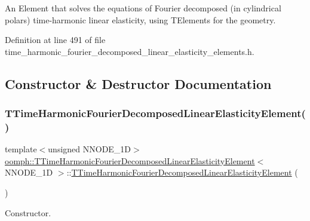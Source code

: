 An Element that solves the equations of Fourier decomposed (in cylindrical polars) time-\/harmonic linear elasticity, using T\+Elements for the geometry. 

Definition at line 491 of file time\+\_\+harmonic\+\_\+fourier\+\_\+decomposed\+\_\+linear\+\_\+elasticity\+\_\+elements.\+h.



\subsection{Constructor \& Destructor Documentation}
\mbox{\label{classoomph_1_1TTimeHarmonicFourierDecomposedLinearElasticityElement_ad94e8a6c8133172e65185a96cc53f68e}} 
\subsubsection{\texorpdfstring{T\+Time\+Harmonic\+Fourier\+Decomposed\+Linear\+Elasticity\+Element()}{TTimeHarmonicFourierDecomposedLinearElasticityElement()}}
{\footnotesize\ttfamily template$<$unsigned N\+N\+O\+D\+E\+\_\+1D$>$ \\
\hyperlink{classoomph_1_1TTimeHarmonicFourierDecomposedLinearElasticityElement}{oomph\+::\+T\+Time\+Harmonic\+Fourier\+Decomposed\+Linear\+Elasticity\+Element}$<$ N\+N\+O\+D\+E\+\_\+1D $>$\+::\hyperlink{classoomph_1_1TTimeHarmonicFourierDecomposedLinearElasticityElement}{T\+Time\+Harmonic\+Fourier\+Decomposed\+Linear\+Elasticity\+Element} (\begin{DoxyParamCaption}{ }\end{DoxyParamCaption})\hspace{0.3cm}{\ttfamily [inline]}}



Constructor. 



